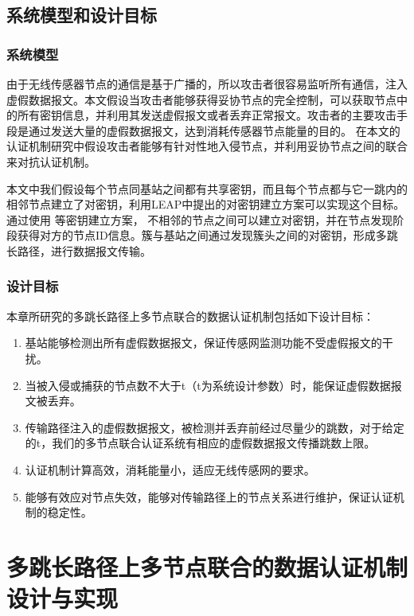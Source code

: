 \subsection{系统模型和设计目标}
\subsubsection{系统模型}
由于无线传感器节点的通信是基于广播的，所以攻击者很容易监听所有通信，注入虚假数据报文。本文假设当攻击者能够获得妥协节点的完全控制，可以获取节点中的所有密钥信息，并利用其发送虚假报文或者丢弃正常报文。攻击者的主要攻击手段是通过发送大量的虚假数据报文，达到消耗传感器节点能量的目的。
在本文的认证机制研究中假设攻击者能够有针对性地入侵节点，并利用妥协节点之间的联合来对抗认证机制。

本文中我们假设每个节点同基站之间都有共享密钥，而且每个节点都与它一跳内的相邻节点建立了对密钥，利用LEAP中提出的对密钥建立方案可以实现这个目标。
通过使用 等密钥建立方案，
不相邻的节点之间可以建立对密钥，并在节点发现阶段获得对方的节点ID信息。簇与基站之间通过发现簇头之间的对密钥，形成多跳长路径，进行数据报文传输。


\subsubsection{设计目标}
本章所研究的多跳长路径上多节点联合的数据认证机制包括如下设计目标：
\begin{enumerate}\setlength{\itemsep}{-\itemsep}
  \item 基站能够检测出所有虚假数据报文，保证传感网监测功能不受虚假报文的干扰。
  \item 当被入侵或捕获的节点数不大于t（t为系统设计参数）时，能保证虚假数据报文被丢弃。
  \item 传输路径注入的虚假数据报文，被检测并丢弃前经过尽量少的跳数，对于给定的t，我们的多节点联合认证系统有相应的虚假数据报文传播跳数上限。
  \item 认证机制计算高效，消耗能量小，适应无线传感网的要求。
  \item 能够有效应对节点失效，能够对传输路径上的节点关系进行维护，保证认证机制的稳定性。
\end{enumerate}

\section{多跳长路径上多节点联合的数据认证机制设计与实现}
